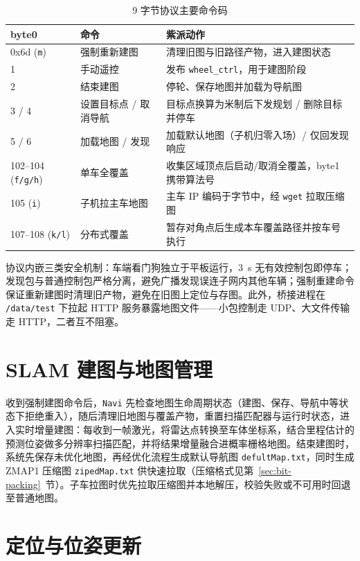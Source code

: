 \begin{table}[htbp]
\centering
\caption{9 字节协议主要命令码}
\label{tab:command-codes}
\small
\begin{tabularx}{\textwidth}{p{1.8cm}p{2.8cm}X}
\toprule
\textbf{byte0} & \textbf{命令} & \textbf{紫派动作} \\
\midrule
0x6d (\texttt{m}) & 强制重新建图 & 清理旧图与旧路径产物，进入建图状态 \\
1 & 手动遥控 & 发布 \texttt{wheel\_ctrl}，用于建图阶段 \\
2 & 结束建图 & 停轮、保存地图并加载为导航图 \\
3 / 4 & 设置目标点 / 取消导航 & 目标点换算为米制后下发规划 / 删除目标并停车 \\
5 / 6 & 加载地图 / 发现 & 加载默认地图（子机归零入场）/ 仅回发现响应 \\
102--104 (\texttt{f/g/h}) & 单车全覆盖 & 收集区域顶点后启动/取消全覆盖，byte1 携带算法号 \\
105 (\texttt{i}) & 子机拉主车地图 & 主车 IP 编码于字节中，经 \texttt{wget} 拉取压缩图 \\
107--108 (\texttt{k/l}) & 分布式覆盖 & 暂存对角点后生成本车覆盖路径并按车号执行 \\
\bottomrule
\end{tabularx}
\end{table}

协议内嵌三类安全机制：车端看门狗独立于平板运行，3~s 无有效控制包即停车；发现包与普通控制包严格分离，避免广播发现误连子网内其他车辆；强制重建命令保证重新建图时清理旧产物，避免在旧图上定位与存图。此外，桥接进程在 \texttt{/data/test} 下拉起 HTTP 服务暴露地图文件——小包控制走 UDP、大文件传输走 HTTP，二者互不阻塞。

\section{SLAM 建图与地图管理}
\label{sec:slam-mapping}

收到强制建图命令后，\texttt{Navi} 先检查地图生命周期状态（建图、保存、导航中等状态下拒绝重入），随后清理旧地图与覆盖产物，重置扫描匹配器与运行时状态，进入实时增量建图：每收到一帧激光，将雷达点转换至车体坐标系，结合里程估计的预测位姿做多分辨率扫描匹配，并将结果增量融合进概率栅格地图。结束建图时，系统先保存未优化地图，再经优化流程生成默认导航图 \texttt{defultMap.txt}，同时生成 ZMAP1 压缩图 \texttt{zipedMap.txt} 供快速拉取（压缩格式见第~\ref{sec:bit-packing}~节）。子车拉图时优先拉取压缩图并本地解压，校验失败或不可用时回退至普通地图。

\section{定位与位姿更新}
\label{sec:localization}

